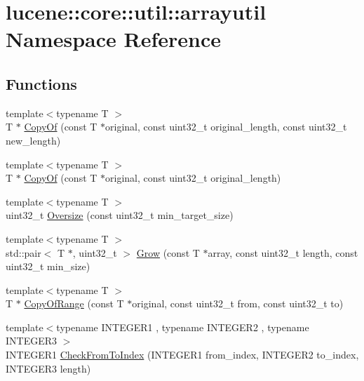 \hypertarget{namespacelucene_1_1core_1_1util_1_1arrayutil}{}\section{lucene\+:\+:core\+:\+:util\+:\+:arrayutil Namespace Reference}
\label{namespacelucene_1_1core_1_1util_1_1arrayutil}
\subsection*{Functions}
\begin{DoxyCompactItemize}
\item 
{\footnotesize template$<$typename T $>$ }\\T $\ast$ \mbox{\hyperlink{namespacelucene_1_1core_1_1util_1_1arrayutil_a42793db2e08af25c01c19eb099ec7d1d}{Copy\+Of}} (const T $\ast$original, const uint32\+\_\+t original\+\_\+length, const uint32\+\_\+t new\+\_\+length)
\item 
{\footnotesize template$<$typename T $>$ }\\T $\ast$ \mbox{\hyperlink{namespacelucene_1_1core_1_1util_1_1arrayutil_a5a4d6233afed538be3d004f5bd14375b}{Copy\+Of}} (const T $\ast$original, const uint32\+\_\+t original\+\_\+length)
\item 
{\footnotesize template$<$typename T $>$ }\\uint32\+\_\+t \mbox{\hyperlink{namespacelucene_1_1core_1_1util_1_1arrayutil_a88b54ef3001bf083cb1262383618c841}{Oversize}} (const uint32\+\_\+t min\+\_\+target\+\_\+size)
\item 
{\footnotesize template$<$typename T $>$ }\\std\+::pair$<$ T $\ast$, uint32\+\_\+t $>$ \mbox{\hyperlink{namespacelucene_1_1core_1_1util_1_1arrayutil_a7776f2f4497c07c79bfd8767a3b505d0}{Grow}} (const T $\ast$array, const uint32\+\_\+t length, const uint32\+\_\+t min\+\_\+size)
\item 
{\footnotesize template$<$typename T $>$ }\\T $\ast$ \mbox{\hyperlink{namespacelucene_1_1core_1_1util_1_1arrayutil_a107a721d94f4e31167dc49e3b07ac859}{Copy\+Of\+Range}} (const T $\ast$original, const uint32\+\_\+t from, const uint32\+\_\+t to)
\item 
{\footnotesize template$<$typename I\+N\+T\+E\+G\+E\+R1 , typename I\+N\+T\+E\+G\+E\+R2 , typename I\+N\+T\+E\+G\+E\+R3 $>$ }\\I\+N\+T\+E\+G\+E\+R1 \mbox{\hyperlink{namespacelucene_1_1core_1_1util_1_1arrayutil_a4268c9d6e916463cb412335111220f11}{Check\+From\+To\+Index}} (I\+N\+T\+E\+G\+E\+R1 from\+\_\+index, I\+N\+T\+E\+G\+E\+R2 to\+\_\+index, I\+N\+T\+E\+G\+E\+R3 length)

\end{DoxyCompactItemize}
